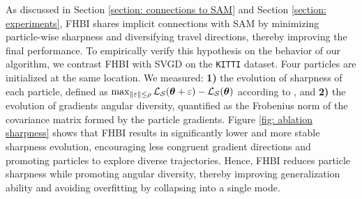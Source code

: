As discussed in Section \ref{section: connections to SAM} and Section \ref{section: experiments}, FHBI shares implicit connections with SAM by minimizing particle-wise sharpness and diversifying travel directions, thereby improving the final performance. To empirically verify this hypothesis on the behavior of our algorithm, we contrast FHBI with SVGD  on the \texttt{KITTI} dataset. Four particles are initialized at the same location. We measured: \textbf{1)} the evolution of sharpness of each particle, defined as $\max_{\|\varepsilon\| \leq \rho} {\mathcal{L}}_{\mathcal{S}}({\bm{\theta}} + \varepsilon) - {\mathcal{L}}_{\mathcal{S}}({\bm{\theta}})$ according to \citet{sam}, and \textbf{2)} the evolution of gradients angular diversity, quantified as the Frobenius norm of the covariance matrix formed by the particle gradients. Figure \ref{fig: ablation sharpness} shows that FHBI results in significantly lower and more stable sharpness evolution, encouraging less congruent gradient directions and promoting particles to explore diverse trajectories. Hence, FHBI reduces particle sharpness while promoting angular diversity, thereby improving generalization ability and avoiding overfitting by collapsing into a single mode.




